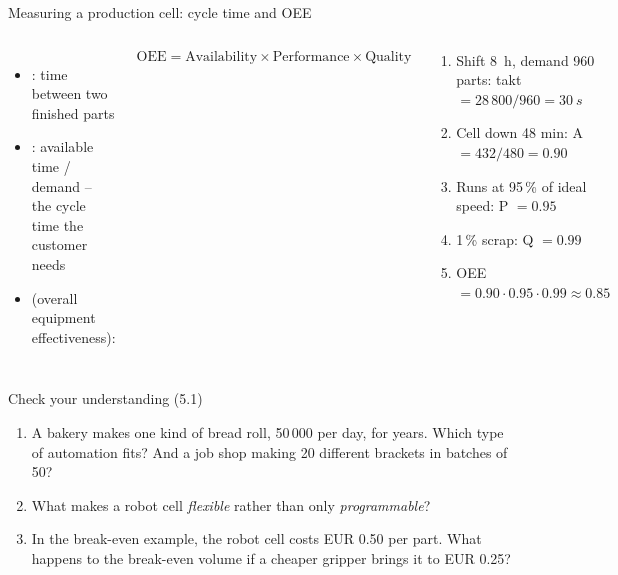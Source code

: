 \documentclass[aspectratio=169,10pt]{beamer}
\begin{document}
\begin{frame}[t]{Measuring a production cell: cycle time and OEE}
\begin{columns}[T,onlytextwidth]
\begin{itemize}\small
\item {}: time between two finished parts
\item {}: available time / demand -- the cycle time the customer needs
\item {} (overall equipment effectiveness):
\end{itemize}
\begin{eqbox}
\[ \text{OEE} = \text{Availability}\times\text{Performance}\times\text{Quality} \]
\end{eqbox}
\begin{keybox}
\small
\begin{enumerate}
\item Shift \SI{8}{h}, demand 960 parts: takt $=28\,800/960=\SI{30}{s}$
\item Cell down 48 min: A $=432/480=0.90$
\item Runs at 95\,\% of ideal speed: P $=0.95$
\item 1\,\% scrap: Q $=0.99$
\item OEE $=0.90\cdot0.95\cdot0.99\approx0.85$
\end{enumerate}
\end{keybox}
\end{columns}
\end{frame}

\begin{frame}[t]{Check your understanding (5.1)}
\begin{keybox}
\begin{enumerate}\small
\item A bakery makes one kind of bread roll, 50\,000 per day, for years. Which type of automation fits? And a job shop making 20 different brackets in batches of 50?
\item What makes a robot cell \emph{flexible} rather than only \emph{programmable}?
\item In the break-even example, the robot cell costs EUR 0.50 per part. What happens to the break-even volume if a cheaper gripper brings it to EUR 0.25?
\end{enumerate}
\end{keybox}
\end{frame}
\end{document}
